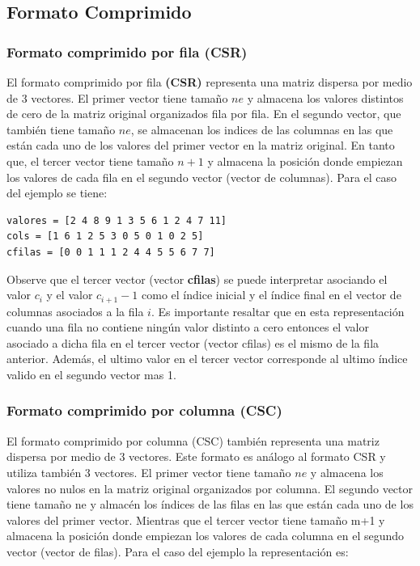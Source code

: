 \documentclass[onecolumn]{article}
\begin{document}
\subsection{Formato Comprimido}


\subsubsection{Formato comprimido por fila (CSR)}
El formato comprimido por fila \textbf{(CSR)} representa una matriz dispersa por
medio de 3 vectores. El primer vector tiene tamaño $ne$ y almacena los valores distintos de cero de la matriz
original organizados fila por fila. En el segundo vector, que también tiene tamaño $ne$, se almacenan
los indices de las columnas en las que están cada uno de los valores del primer vector en la matriz original.
En tanto que, el tercer vector tiene tamaño $n+1$ y almacena la posición donde empiezan los valores de
cada fila en el segundo vector (vector de columnas). Para el caso del ejemplo se tiene:

\begin{lstlisting}
valores = [2 4 8 9 1 3 5 6 1 2 4 7 11]
cols = [1 6 1 2 5 3 0 5 0 1 0 2 5]
cfilas = [0 0 1 1 1 2 4 4 5 5 6 7 7]
\end{lstlisting}

Observe que el tercer vector (vector \textbf{cfilas}) se puede interpretar asociando el valor $c_i$ y el valor $c_{i+1}-1$ 
como el índice inicial y el índice final en el vector de columnas asociados a la fila $i$. 
Es importante resaltar que en esta representación cuando una fila no contiene ningún valor distinto a cero entonces el valor asociado a dicha fila en el tercer
vector (vector cfilas) es el mismo de la fila anterior. Además, el ultimo valor en el tercer vector corresponde al ultimo índice valido en el segundo vector
mas 1.


\subsubsection{Formato comprimido por columna (CSC)}

El formato comprimido por columna (CSC) también representa una matriz dispersa por medio de 3 vectores. Este formato
es análogo al formato CSR y utiliza también 3 vectores. El primer vector tiene tamaño $ne$ y almacena
los valores no nulos en la matriz original organizados por columna. El segundo vector tiene tamaño
ne y almacén los índices de las filas en las que están
cada uno de los valores del primer vector. Mientras que el tercer vector tiene tamaño m+1 y almacena la
posición donde empiezan los valores de cada columna en el segundo vector (vector de filas).
Para el caso del ejemplo la representación es:
\end{document}
